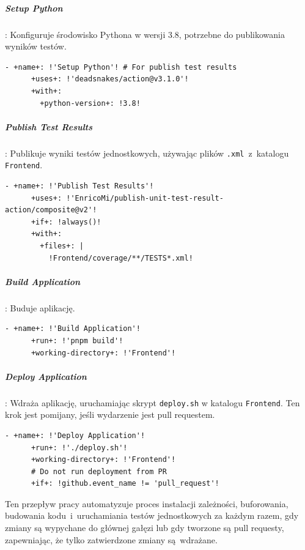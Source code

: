 \subparagraph{Setup Python}: Konfiguruje środowisko Pythona w wersji 3.8, potrzebne do publikowania wyników testów.
\begin{lstlisting}[style=yaml-colored]
    - +name+: !'Setup Python'! # For publish test results
      +uses+: !'deadsnakes/action@v3.1.0'!
      +with+:
        +python-version+: !3.8!
\end{lstlisting}

\subparagraph{Publish Test Results}: Publikuje wyniki testów jednostkowych, używając plików \texttt{\textcolor{codeblue}{.xml}}~z~katalogu \texttt{\textcolor{codeblue}{Frontend}}.
\begin{lstlisting}[style=yaml-colored]
    - +name+: !'Publish Test Results'!
      +uses+: !'EnricoMi/publish-unit-test-result-action/composite@v2'!
      +if+: !always()!
      +with+:
        +files+: |
          !Frontend/coverage/**/TESTS*.xml!
\end{lstlisting}

\subparagraph{Build Application}: Buduje aplikację.
\begin{lstlisting}[style=yaml-colored]
    - +name+: !'Build Application'!
      +run+: !'pnpm build'!
      +working-directory+: !'Frontend'!
\end{lstlisting}

\subparagraph{Deploy Application}: Wdraża aplikację, uruchamiając skrypt \texttt{\textcolor{codeblue}{deploy.sh}} w katalogu \texttt{\textcolor{codeblue}{Frontend}}. Ten krok jest pomijany, jeśli wydarzenie jest pull requestem.
\begin{lstlisting}[style=yaml-colored]
    - +name+: !'Deploy Application'!
      +run+: !'./deploy.sh'!
      +working-directory+: !'Frontend'!
      # Do not run deployment from PR
      +if+: !github.event_name != 'pull_request'!
\end{lstlisting}

Ten przepływ pracy automatyzuje proces instalacji zależności, buforowania, budowania kodu~i~uruchamiania testów jednostkowych za każdym razem, gdy zmiany są wypychane do głównej gałęzi lub gdy tworzone są pull requesty, zapewniając, że tylko zatwierdzone zmiany są~wdrażane.

